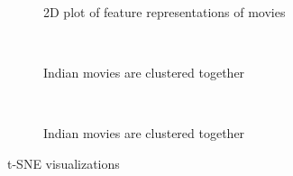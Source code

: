 \documentclass{article} %
\begin{document}
\begin{figure}[h]
	\centering
	\begin{subfigure}[b]{0.45\textwidth}
	\caption{2D plot of feature representations of movies}
	\label{fig:lda-movies}
	\end{subfigure}
	~
	\begin{subfigure}[b]{0.45\textwidth}
	\caption{Indian movies are clustered together}
	\label{fig:indian-movies}
	\end{subfigure}
	~
	\begin{subfigure}[b]{0.45\textwidth}
	\caption{Indian movies are clustered together}
	\label{fig:indian-movies}
	\end{subfigure}
\caption{t-SNE visualizations}
\label{fig:models}
\end{figure}
\end{document}
